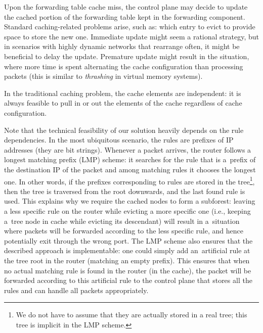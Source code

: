 Upon the forwarding table cache miss, the control plane may decide to update the cached portion of the forwarding table kept in the forwarding component.
Standard caching-related problems arise, such as: which entry to evict to provide space to store the new one.
Immediate update might seem a rational strategy, but in scenarios with highly dynamic networks that rearrange often, it might be beneficial to delay the update.
Premature update might result in the situation, where more time is spent alternating the cache configuration than processing packets (this is similar to \emph{thrashing} in virtual memory systems).

In the traditional caching problem, the cache elements are independent: it is always feasible to pull in or out the elements of the cache regardless of cache configuration.

Note that the technical feasibility of our solution heavily depends on the
rule dependencies. In the most ubiquitous scenario, the rules are prefixes of
IP addresses (they are bit strings). Whenever a packet arrives, the router
follows a longest matching prefix (LMP) scheme: it searches for the rule that
is a~prefix of the destination IP of the packet and among matching rules it
chooses the longest one. In other words, if the prefixes corresponding to
rules are stored in the tree\footnote{We do not have to assume that they are
actually stored in a real tree; this tree is implicit in the LMP scheme.},
then the tree is traversed from the root downwards, and the last found rule is
used. This explains why we require the cached nodes to form a subforest:
leaving a less specific rule on the router while evicting a more specific one
(i.e., keeping a~tree node in cache while evicting its descendant) will result
in a~situation where packets will be forwarded according to the less specific
rule, and hence potentially exit through the wrong port. The LMP scheme also
ensures that the described approach is implementable: one could simply add
an~artificial rule at the tree root in the router (matching an empty prefix).
This ensures that when no actual matching rule is found in the router (in the
cache), the packet will be forwarded according to this artificial rule to the
control plane that stores all the rules and can handle all packets appropriately.





